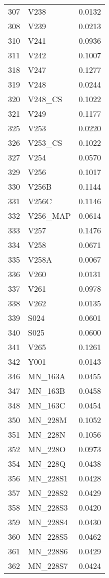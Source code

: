 \documentclass{amsart}
\begin{document}
\begin{longtable}{rlr}
  307 & V238 & 0.0132 \\ 
  308 & V239 & 0.0213 \\ 
  310 & V241 & 0.0936 \\ 
  311 & V242 & 0.1007 \\ 
  318 & V247 & 0.1277 \\ 
  319 & V248 & 0.0244 \\ 
  320 & V248\_CS & 0.1022 \\ 
  321 & V249 & 0.1177 \\ 
  325 & V253 & 0.0220 \\ 
  326 & V253\_CS & 0.1022 \\ 
  327 & V254 & 0.0570 \\ 
  329 & V256 & 0.1017 \\ 
  330 & V256B & 0.1144 \\ 
  331 & V256C & 0.1146 \\ 
  332 & V256\_MAP & 0.0614 \\ 
  333 & V257 & 0.1476 \\ 
  334 & V258 & 0.0671 \\ 
  335 & V258A & 0.0067 \\ 
  336 & V260 & 0.0131 \\ 
  337 & V261 & 0.0978 \\ 
  338 & V262 & 0.0135 \\ 
  339 & S024 & 0.0601 \\ 
  340 & S025 & 0.0600 \\ 
  341 & V265 & 0.1261 \\ 
  342 & Y001 & 0.0143 \\ 
  346 & MN\_163A & 0.0455 \\ 
  347 & MN\_163B & 0.0458 \\ 
  348 & MN\_163C & 0.0454 \\ 
  350 & MN\_228M & 0.1052 \\ 
  351 & MN\_228N & 0.1056 \\ 
  352 & MN\_228O & 0.0973 \\ 
  354 & MN\_228Q & 0.0438 \\ 
  356 & MN\_228S1 & 0.0428 \\ 
  357 & MN\_228S2 & 0.0429 \\ 
  358 & MN\_228S3 & 0.0420 \\ 
  359 & MN\_228S4 & 0.0430 \\ 
  360 & MN\_228S5 & 0.0462 \\ 
  361 & MN\_228S6 & 0.0429 \\ 
  362 & MN\_228S7 & 0.0424 \\ 

\end{longtable}
\end{document}

